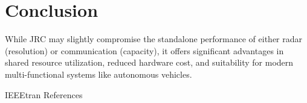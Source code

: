 \documentclass[conference]{IEEEtran}
\begin{document}
\section {Conclusion}
While JRC may slightly compromise the standalone performance of either radar (resolution) or communication (capacity), it offers significant advantages in shared resource utilization, reduced hardware cost, and suitability for modern multi-functional systems like autonomous vehicles.


	 {IEEEtran}
	 {References}
	
  
\end{document}
